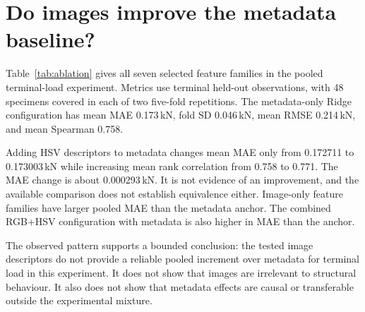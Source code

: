 \section{Do images improve the metadata baseline?}\label{sec:ablation}
Table~\ref{tab:ablation} gives all seven selected feature families in the pooled terminal-load experiment. Metrics use terminal held-out observations, with 48 specimens covered in each of two five-fold repetitions. The metadata-only Ridge configuration has mean MAE 0.173\,kN, fold SD 0.046\,kN, mean RMSE 0.214\,kN, and mean Spearman 0.758.
\begin{table}[htbp]\centering\small
\caption[Pooled terminal-load feature-family results]{Pooled terminal-load comparison for 48 specimens across ten grouped folds. MAE and its sample SD are in kN; $R^2$ and Spearman $\rho$ are arithmetic means of fold metrics. Each feature family shows its selected model, chosen using the same saved folds. The table is an exploratory comparison, not a nested estimate of the model-selection procedure or a significance test.}\label{tab:ablation}

\end{table}
\FloatBarrier
Adding HSV descriptors to metadata changes mean MAE only from 0.172711 to 0.173003\,kN while increasing mean rank correlation from 0.758 to 0.771. The MAE change is about 0.000293\,kN. It is not evidence of an improvement, and the available comparison does not establish equivalence either. Image-only feature families have larger pooled MAE than the metadata anchor. The combined RGB+HSV configuration with metadata is also higher in MAE than the anchor.


The observed pattern supports a bounded conclusion: the tested image descriptors do not provide a reliable pooled increment over metadata for terminal load in this experiment. It does not show that images are irrelevant to structural behaviour. It also does not show that metadata effects are causal or transferable outside the experimental mixture.

